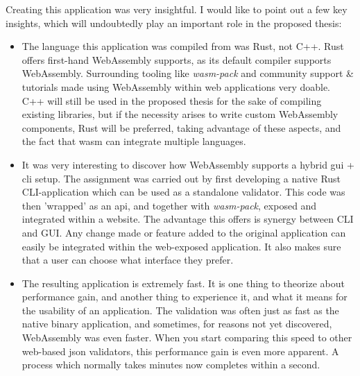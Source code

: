 Creating this application was very insightful. I would like to point out a few key insights, which will undoubtedly play an important role in the proposed thesis: 

\begin{itemize}

    \item The language this application was compiled from was Rust, not C++. Rust offers first-hand WebAssembly supports, as its default compiler supports WebAssembly. Surrounding tooling like \textit{wasm-pack} and community support \& tutorials made using WebAssembly within web applications very doable. 
    C++ will still be used in the proposed thesis for the sake of compiling existing libraries, but if the necessity arises to write custom WebAssembly components, Rust will be preferred, taking advantage of these aspects, and the fact that wasm can integrate multiple languages.

    \item It was very interesting to discover how WebAssembly supports a hybrid gui + cli setup. 
    The assignment was carried out by first developing a native Rust CLI-application which can be used as a standalone validator. 
    This code was then 'wrapped' as an api, and together with \textit{wasm-pack}, exposed and integrated within a website. 
    The advantage this offers is synergy between CLI and GUI. Any change made or feature added to the original application can easily be integrated within the web-exposed application. It also makes sure that a user can choose what interface they prefer. 


    \item The resulting application is extremely fast. It is one thing to theorize about performance gain, and another thing to experience it, and what it means for the usability of an application. The validation was often just as fast as the native binary application, and sometimes, for reasons not yet discovered, WebAssembly was even faster. When you start comparing this speed to other web-based json validators, this performance gain is even more apparent. A process which normally takes minutes now completes within a second. 


\end{itemize}


